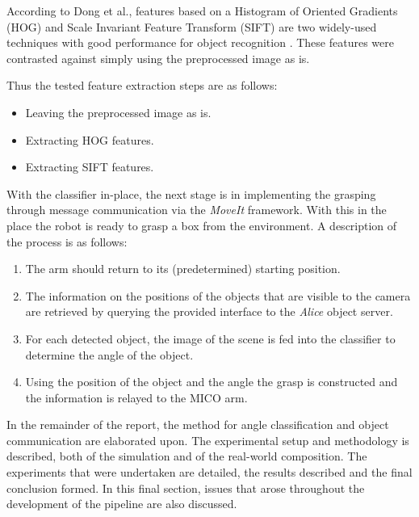 \documentclass[letterpaper, 10 pt, conference]{conf/ieeeconf}  %
\begin{document}
According to Dong et al., features based on a Histogram of Oriented Gradients
(HOG) and Scale Invariant Feature Transform (SIFT) are two widely-used
techniques with good performance for object recognition \cite{Dong2010}. These
features were contrasted against simply using the preprocessed image as is.

Thus the tested feature extraction steps are as follows:
\begin{itemize}
\item Leaving the preprocessed image as is.
\item Extracting HOG features.
\item Extracting SIFT features.
\end{itemize}


With the classifier in-place, the next stage is in implementing the grasping through message communication via the \textit{MoveIt} framework. With this in the place the robot is ready to grasp a box from the environment. A description of the process is as follows:

\begin{enumerate}
\item The arm should return to its (predetermined) starting position.
\item The information on the positions of the objects that are visible to the camera are retrieved by querying the provided interface to the \textit{Alice} object server.
\item For each detected object, the image of the scene is fed into the classifier to determine the angle of the object.
\item Using the position of the object and the angle the grasp is constructed and the information is relayed to the MICO arm.
\end{enumerate}

In the remainder of the report, the method for angle classification and object communication are elaborated upon. The experimental setup and methodology is described, both of the simulation and of the real-world composition. The experiments that were undertaken are detailed, the results described and the final conclusion formed. In this final section, issues that arose throughout the development of the pipeline are also discussed.

\end{document}
